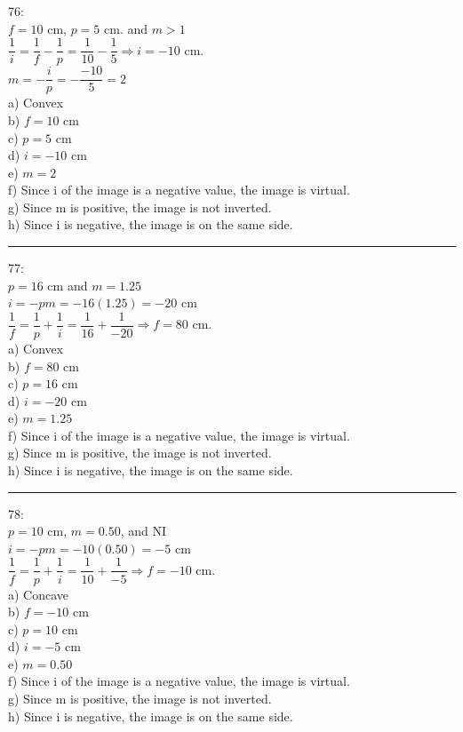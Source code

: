 \documentclass[fleqn]{article}
\begin{document}
\begin{enumerate}
    \textcolor{hwColor}{
      76: \\
      $f=10$ cm, $p=5$ cm. and $m>1$  \\
      $\dfrac{1}{i}=\dfrac{1}{f}-\dfrac{1}{p}=\dfrac{1}{10}-\dfrac{1}{5} \Longrightarrow i=-10$ cm. \\
      $m=-\dfrac{i}{p}=-\dfrac{-10}{5}=2$ \\
      a) Convex \\
      b) $f=10$ cm \\
      c) $p=5$ cm \\
      d) $i=-10$ cm \\
      e) $m=2$ \\
      f) Since i of the image is a negative value, the image is virtual. \\
      g) Since m is positive, the image is not inverted. \\
      h) Since i is negative, the image is on the same side. \\
    }

    \textcolor{hwColor}{
      \rule{15cm}{0.4pt}
    }

    \textcolor{hwColor}{
      77: \\
      $p=16$ cm and $m=1.25$ \\
      $i=-pm=-16(1.25)=-20$ cm \\
      $\dfrac{1}{f}=\dfrac{1}{p}+\dfrac{1}{i}=\dfrac{1}{16}+\dfrac{1}{-20} \Longrightarrow f=80$ cm. \\
      a) Convex \\
      b) $f=80$ cm \\
      c) $p=16$ cm \\
      d) $i=-20$ cm \\
      e) $m=1.25$ \\
      f) Since i of the image is a negative value, the image is virtual. \\
      g) Since m is positive, the image is not inverted. \\
      h) Since i is negative, the image is on the same side. \\
    }

    \textcolor{hwColor}{
      \rule{15cm}{0.4pt}
    }

    \textcolor{hwColor}{
      78: \\
      $p=10$ cm, $m=0.50$, and NI \\
      $i=-pm=-10(0.50)=-5$ cm \\
      $\dfrac{1}{f}=\dfrac{1}{p}+\dfrac{1}{i}=\dfrac{1}{10}+\dfrac{1}{-5} \Longrightarrow f=-10$ cm. \\
      a) Concave \\
      b) $f=-10$ cm \\
      c) $p=10$ cm \\
      d) $i=-5$ cm \\
      e) $m=0.50$ \\
      f) Since i of the image is a negative value, the image is virtual. \\
      g) Since m is positive, the image is not inverted. \\
      h) Since i is negative, the image is on the same side. \\
    }


\end{enumerate}
\end{document}
